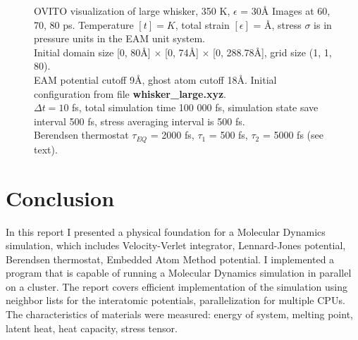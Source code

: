 \documentclass[12pt,a4paper]{article}
\begin{document}
\begin{figure}[h!]
\begin{minipage}{.3\textwidth}
	\end{minipage}
	\caption{OVITO visualization of large whisker, 350 K, $\epsilon$ = 30Å Images at 60, 70, 80 ps. Temperature $[t]=K$, total strain $[\epsilon]$ = Å, stress $\sigma$ is in pressure units in the EAM unit system.\\
		Initial domain size [0, 80Å] $\times$ [0, 74Å] $\times$ [0, 288.78Å], grid size (1, 1, 80).\\
		EAM potential cutoff 9Å, ghost atom cutoff 18Å. Initial configuration from file {\bf whisker\_large.xyz}.\\
		$\Delta t = 10$ fs, total simulation time 100 000 fs, simulation state save interval 500 fs, stress averaging interval is 500 fs.\\
		Berendsen thermostat $\tau_{EQ}$ = 2000 fs, $\tau_1$ = 500 fs, $\tau_2$ = 5000 fs (see text).
	}
	\label{fig:whisker-large-defect}
\end{figure}

\clearpage

\section{Conclusion}
\label{conclusion}

In this report I presented a physical foundation for a Molecular Dynamics simulation, which includes Velocity-Verlet integrator, Lennard-Jones potential, Berendsen thermostat, Embedded Atom Method potential. I implemented a program that is capable of running a Molecular Dynamics simulation in parallel on a cluster. The report covers efficient implementation of the simulation using neighbor lists for the interatomic potentials, parallelization for multiple CPUs. The characteristics of materials were measured: energy of system, melting point, latent heat, heat capacity, stress tensor.

\newpage
{\small
	
	
}
\end{document}
